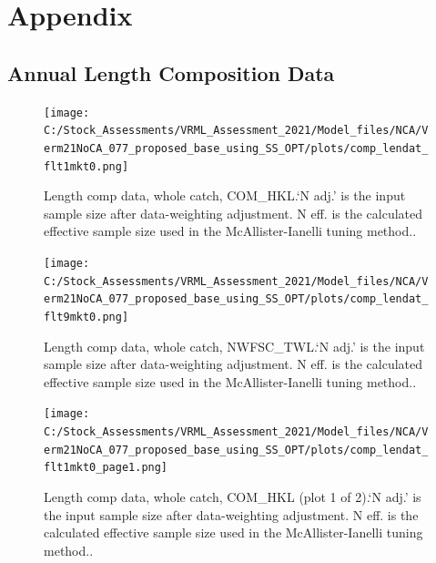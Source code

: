 \documentclass[11pt,
  english,
  a4paper,
]{article}
\begin{document}
\FloatBarrier

\clearpage


\hypertarget{appendix}{%
\section{Appendix}\label{appendix}}

\leavevmode\tagmcend\tagstructend


\hypertarget{annual-length-composition-data}{%
\subsection{Annual Length Composition Data}\label{annual-length-composition-data}}

\leavevmode\tagmcend\tagstructend

\begin{figure}
\centering
\texttt{[image: C:/Stock\_Assessments/VRML\_Assessment\_2021/Model\_files/NCA/Verm21NoCA\_077\_proposed\_base\_using\_SS\_OPT/plots/comp\_lendat\_flt1mkt0.png]}
\caption{Length comp data, whole catch, COM\_HKL.`N adj.' is the input sample size after data-weighting adjustment. N eff. is the calculated effective sample size used in the McAllister-Ianelli tuning method..\label{fig:comp_lendat_flt1mkt0}}
\end{figure}

\begin{figure}
\centering
\texttt{[image: C:/Stock\_Assessments/VRML\_Assessment\_2021/Model\_files/NCA/Verm21NoCA\_077\_proposed\_base\_using\_SS\_OPT/plots/comp\_lendat\_flt9mkt0.png]}
\caption{Length comp data, whole catch, NWFSC\_TWL.`N adj.' is the input sample size after data-weighting adjustment. N eff. is the calculated effective sample size used in the McAllister-Ianelli tuning method..\label{fig:comp_lendat_flt9mkt0}}
\end{figure}

\begin{figure}
\centering
\texttt{[image: C:/Stock\_Assessments/VRML\_Assessment\_2021/Model\_files/NCA/Verm21NoCA\_077\_proposed\_base\_using\_SS\_OPT/plots/comp\_lendat\_flt1mkt0\_page1.png]}
\caption{Length comp data, whole catch, COM\_HKL (plot 1 of 2).`N adj.' is the input sample size after data-weighting adjustment. N eff. is the calculated effective sample size used in the McAllister-Ianelli tuning method..\label{fig:comp_lendat_flt1mkt0_page1}}
\end{figure}
\end{document}
